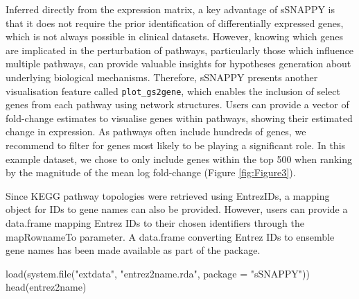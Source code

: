 \documentclass[9pt,a4paper,]{extarticle}
\newenvironment{Shaded}{\begin{snugshade}}{\end{snugshade}}
\newcommand{\AttributeTok}[1]{\textcolor[rgb]{0.77,0.63,0.00}{#1}}
\newcommand{\DecValTok}[1]{\textcolor[rgb]{0.00,0.00,0.81}{#1}}
\newcommand{\FunctionTok}[1]{\textcolor[rgb]{0.00,0.00,0.00}{#1}}
\newcommand{\NormalTok}[1]{#1}
\newcommand{\OtherTok}[1]{\textcolor[rgb]{0.56,0.35,0.01}{#1}}
\newcommand{\SpecialCharTok}[1]{\textcolor[rgb]{0.00,0.00,0.00}{#1}}
\newcommand{\StringTok}[1]{\textcolor[rgb]{0.31,0.60,0.02}{#1}}
\begin{document}
Inferred directly from the expression matrix, a key advantage of sSNAPPY is that it does not require the prior identification of differentially expressed genes, which is not always possible in clinical datasets.
However, knowing which genes are implicated in the perturbation of pathways, particularly those which influence multiple pathways, can provide valuable insights for hypotheses generation about underlying biological mechanisms.
Therefore, sSNAPPY presents another visualisation feature called \texttt{plot\_gs2gene}, which enables the inclusion of select genes from each pathway using network structures.
Users can provide a vector of fold-change estimates to visualise genes within pathways, showing their estimated change in expression.
As pathways often include hundreds of genes, we recommend to filter for genes most likely to be playing a significant role.
In this example dataset, we chose to only include genes within the top 500 when ranking by the magnitude of the mean log fold-change (Figure \ref{fig:Figure3}).

\begin{Shaded}
\end{Shaded}

Since KEGG pathway topologies were retrieved using EntrezIDs, a mapping object for IDs to gene names can also be provided.
However, users can provide a data.frame mapping Entrez IDs to their chosen identifiers through the mapRownameTo parameter.
A data.frame converting Entrez IDs to ensemble gene names has been made available as part of the package.

\begin{Shaded}
\begin{Highlighting}[]
\FunctionTok{load}\NormalTok{(}\FunctionTok{system.file}\NormalTok{(}\StringTok{"extdata"}\NormalTok{, }\StringTok{"entrez2name.rda"}\NormalTok{, }\AttributeTok{package =} \StringTok{"sSNAPPY"}\NormalTok{))}
\FunctionTok{head}\NormalTok{(entrez2name)}
\end{Highlighting}
\end{Shaded}
\end{document}
